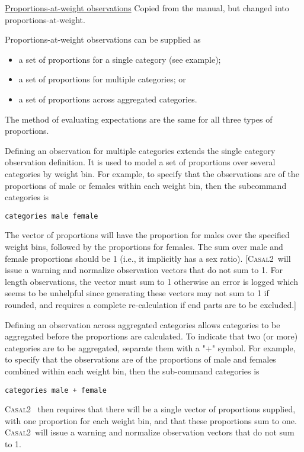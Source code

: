 \documentclass[a4paper,11pt,twoside,pdftex,draft]{article}
\newcommand{\CNAME}{\textsc{Casal2}}
\begin{document}
\bigskip
\underline{Proportions-at-weight observations}
Copied from the manual, but changed into proportions-at-weight.

Proportions-at-weight observations can be supplied as

\begin{itemize}
	\item a set of proportions for a single category (see example);
	\item a set of proportions for multiple categories; or
	\item a set of proportions across aggregated categories.
\end{itemize}

The method of evaluating expectations are the same for all three types of proportions.


Defining an observation for multiple categories extends the single category observation definition. It is used to model a set of proportions over several categories by weight bin. For example, to specify that the observations are of the proportions of male or females within each weight bin, then the subcommand categories is

\texttt{categories male female}

The vector of proportions will have the proportion for males over the specified weight bins, followed by the proportions for females. The sum over male and female proportions should be 1 (i.e., it implicitly has a sex ratio). [\CNAME~will issue a warning and normalize observation vectors that do not sum to 1. For length observations, the vector must sum to 1 otherwise an error is logged which seems to be unhelpful since generating these vectors may not sum to 1 if rounded, and requires a complete re-calculation if end parts are to be excluded.]

Defining an observation across aggregated categories allows categories to be aggregated before the proportions are calculated.  To indicate that two (or more) categories are to be aggregated, separate them with a "+" symbol. For example, to specify that the observations are of the proportions of male and females combined within each weight bin, then the sub-command categories is

\texttt{categories male + female}

\CNAME~ then requires that there will be a single vector of proportions supplied, with one proportion for each weight bin, and that these proportions sum to one. \CNAME~will issue a warning and normalize observation vectors that do not sum to 1.
\end{document}
